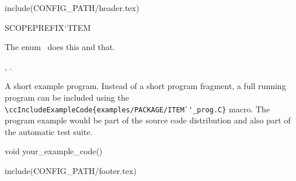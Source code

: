 include(CONFIG_PATH/header.tex)
\begin{ccRefEnum}SCOPE{PREFIX`'ITEM}  %


\ccDefinition
  
The enum \ccRefName\ does this and that.



\ccIsModel


\ccSeeAlso

,
.

\ccExample

A short example program.
Instead of a short program fragment, a full running program can be
included using the 
\verb|\ccIncludeExampleCode{examples/PACKAGE/ITEM`'_prog.C}| 
macro. The program example would be part of the source code distribution and
also part of the automatic test suite.

\begin{ccExampleCode}
void your_example_code() {
}
\end{ccExampleCode}


\end{ccRefEnum}

include(CONFIG_PATH/footer.tex)
